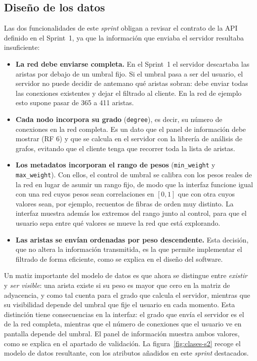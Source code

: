 \subsection{Diseño de los datos}

Las dos funcionalidades de este \textit{sprint} obligan a revisar el contrato de la API definido en
el Sprint~1, ya que la información que enviaba el servidor resultaba insuficiente:

\begin{itemize}
	\item \textbf{La red debe enviarse completa.} En el Sprint~1 el servidor descartaba las aristas
		por debajo de un umbral fijo. Si el umbral pasa a ser del usuario, el servidor no puede decidir
		de antemano qué aristas sobran: debe enviar todas las conexiones existentes y dejar el filtrado
		al cliente. En la red de ejemplo esto supone pasar de 365 a 411 aristas.
	\item \textbf{Cada nodo incorpora su grado} (\texttt{degree}), es decir, su número de conexiones en
		la red completa. Es un dato que el panel de información debe mostrar (RF 6) y que se calcula en
		el servidor con la librería de análisis de grafos, evitando que el cliente tenga que recorrer
		toda la lista de aristas.
	\item \textbf{Los metadatos incorporan el rango de pesos} (\texttt{min\_weight} y
		\texttt{max\_weight}). Con ellos, el control de umbral se calibra con los pesos reales de la red
		en lugar de asumir un rango fijo, de modo que la interfaz funcione igual con una red cuyos pesos
		sean correlaciones en $[0,1]$ que con otra cuyos valores sean, por ejemplo, recuentos de fibras
		de orden muy distinto. La interfaz muestra además los extremos del rango junto al control, para
		que el usuario sepa entre qué valores se mueve la red que está explorando.
	\item \textbf{Las aristas se envían ordenadas por peso descendente.} Esta decisión, que no altera
		la información transmitida, es la que permite implementar el filtrado de forma eficiente, como
		se explica en el diseño del software.
\end{itemize}

Un matiz importante del modelo de datos es que ahora se distingue entre \emph{existir} y \emph{ser
visible}: una arista existe si su peso es mayor que cero en la matriz de adyacencia, y como tal
cuenta para el grado que calcula el servidor, mientras que su visibilidad depende del umbral que
fije el usuario en cada momento. Esta distinción tiene consecuencias en la interfaz: el grado que
envía el servidor es el de la red completa, mientras que el número de conexiones que el usuario ve
en pantalla depende del umbral. El panel de información muestra ambos valores, como se explica en el
apartado de validación. La figura~\ref{fig:clases-s2} recoge el modelo de datos resultante, con los
atributos añadidos en este \textit{sprint} destacados.

